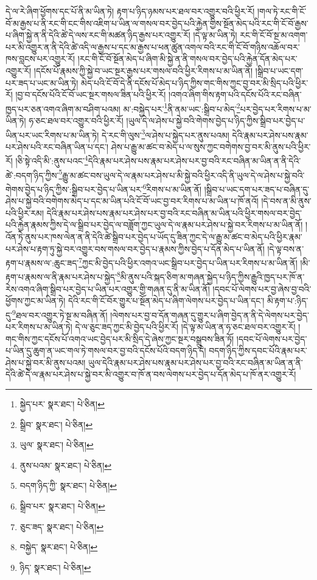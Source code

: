 དེ་ལ་རེ་ཞིག་ཕྱོགས་དང་པོ་ནི་མ་ཡིན་ཏེ། རྟག་པ་ཉིད་ཉམས་པར་ཐལ་བར་འགྱུར་བའི་ཕྱིར་རོ། །གལ་ཏེ་རང་གི་ངོ་བོ་མ་རྒྱས་པ་ནི་རང་གི་ངང་གིས་འཇིག་པ་ཡིན་ལ་གསལ་བར་བྱེད་པའི་རྐྱེན་གྱིས་སྔོན་མེད་པའི་རང་གི་ངོ་བོ་རྒྱས་པ་ཞིག་སྐྱེ་ན་ནི་དེའི་ཚེ་དེ་ལས་རང་གི་མཚན་ཉིད་རྒྱས་པར་འགྱུར་རོ། །དེ་ལྟ་མ་ཡིན་ཏེ། རང་གི་ངོ་བོ་སྔ་མ་འགག་པར་མི་འགྱུར་ན་ནི་དེའི་ཚེ་འདི་ལ་རྒྱས་པ་དང་མ་རྒྱས་པ་ཕན་ཚུན་འགལ་བའི་རང་གི་ངོ་བོ་གཉིས་འཆོལ་བར་ཁས་བླངས་པར་འགྱུར་རོ། །རང་གི་ངོ་བོ་སྔོན་མེད་པ་ཞིག་མི་སྐྱེ་ན་ནི་གསལ་བར་བྱེད་པའི་རྐྱེན་དོན་མེད་པར་འགྱུར་རོ། །དངོས་པོ་རྣམས་ཀྱི་སྐྱེ་བ་ཡང་སྔར་རྒྱས་པར་གསལ་བའི་ཕྱིར་རིགས་པ་མ་ཡིན་ནོ། །སྒྲིབ་པ་ཡང་དག་པར་ཟད་པ་ཡང་མ་ཡིན་ཏེ། མེད་པའི་ངོ་བོ་དེ་ནི་དངོས་པོ་མེད་པ་ཉིད་ཀྱིས་གང་གིས་ཀྱང་བྱ་བར་མི་སྲིད་པའི་ཕྱིར་རོ། །བྱ་བ་དངོས་པོའི་ངོ་བོ་ཡང་སྔར་གསལ་ཟིན་པའི་ཕྱིར་རོ། །འགའ་ཞིག་གིས་རྟག་པའི་དངོས་པོའི་རང་བཞིན་ཁྱད་པར་ཅན་འགའ་ཞིག་མ་བཤིག་པའམ། མ་:བསྐྱེད་པར་\footnote{སྐྱེད་པར་  སྣར་ཐང་།  པེ་ཅིན། }ནི་ནམ་ཡང་:སྒྲིབ་པ་མེད་\footnote{སྒྲིབ་  སྣར་ཐང་།  པེ་ཅིན། }པར་བྱེད་པར་རིགས་པ་མ་ཡིན་ཏེ། ཧ་ཅང་ཐལ་བར་འགྱུར་བའི་ཕྱིར་རོ། །ཡུལ་དེ་ལ་ཤེས་པ་སྐྱེ་བའི་གེགས་བྱེད་པ་ཉིད་ཀྱིས་སྒྲིབ་པར་བྱེད་པ་ཡིན་པར་ཡང་རིགས་པ་མ་ཡིན་ཏེ། དེ་རང་གི་ལུས་\footnote{ཡུལ་  སྣར་ཐང་།  པེ་ཅིན། }ལ་ཤེས་པ་སྐྱེད་པར་ནུས་པའམ། དེའི་རྣམ་པར་ཤེས་པས་རྣམ་པར་ཤེས་པའི་རང་བཞིན་ཡིན་པ་དང་། ཤེས་པ་རྒྱུ་མ་ཚང་བ་མེད་པ་ལ་སུས་ཀྱང་བགེགས་བྱ་བར་མི་ནུས་པའི་ཕྱིར་རོ། །ཅི་སྟེ་འདི་མི་:ནུས་པའང་\footnote{ནུས་པའམ་  སྣར་ཐང་།  པེ་ཅིན། }དེའི་རྣམ་པར་ཤེས་པས་རྣམ་པར་ཤེས་པར་བྱ་བའི་རང་བཞིན་མ་ཡིན་ན་ནི་དེའི་ཚེ་:བདག་ཉིད་ཀྱིས་\footnote{བདག་ཉིད་ཀྱི་  སྣར་ཐང་།  པེ་ཅིན། }རྒྱུ་མ་ཚང་བས་ཡུལ་དེ་ལ་རྣམ་པར་ཤེས་པ་མི་སྐྱེ་བའི་ཕྱིར་འདི་ནི་ཡུལ་དེ་ལ་ཤེས་པ་སྐྱེ་བའི་གེགས་བྱེད་པ་ཉིད་ཀྱིས་:སྒྲིབ་པར་བྱེད་པ་ཡིན་པར་\footnote{སྒྲིབ་པར་  སྣར་ཐང་།  པེ་ཅིན། }རིགས་པ་མ་ཡིན་ནོ། །སྒྲིབ་པ་ཡང་དག་པར་ཟད་པ་བཞིན་དུ་ཤེས་པ་སྐྱེ་བའི་བགེགས་མེད་པ་དང་མ་ཡིན་པའི་ངོ་བོ་ཡང་བྱ་བར་རིགས་པ་མ་ཡིན་པ་ཁོ་ནའོ། །དེ་བས་ན་མི་ནུས་པའི་ཕྱིར་རམ། དེའི་རྣམ་པར་ཤེས་པས་རྣམ་པར་ཤེས་པར་བྱ་བའི་རང་བཞིན་མ་ཡིན་པའི་ཕྱིར་གསལ་བར་བྱེད་པའི་རྐྱེན་རྣམས་ཀྱིས་དེ་ལ་སྒྲིབ་པར་བྱེད་ལ་བཟློག་ཀྱང་ཡུལ་དེ་ལ་རྣམ་པར་ཤེས་པ་སྐྱེ་བར་རིགས་པ་མ་ཡིན་ནོ། །འོན་ཏེ་ནུས་པར་ཁས་ལེན་ན་ནི་དེའི་ཚེ་སྒྲིབ་པར་བྱེད་པ་ཡོད་དུ་ཟིན་ཀྱང་དེ་ལ་རྒྱུ་མ་ཚང་བ་མེད་པའི་ཕྱིར་རྣམ་པར་ཤེས་པ་རྟག་ཏུ་སྐྱེ་བར་འགྱུར་བས་གསལ་བར་བྱེད་པ་རྣམས་ཀྱིས་བྱེད་པ་དོན་མེད་པ་ཡིན་ནོ། །དེ་ལྟ་བས་ན་རྟག་པ་རྣམས་ལ་:ཆུང་ཟད་\footnote{ཅུང་ཟད་  སྣར་ཐང་།  པེ་ཅིན། }ཀྱང་མི་བྱེད་པའི་ཕྱིར་འགའ་ཡང་སྒྲིབ་པར་བྱེད་པ་ཡིན་པར་རིགས་པ་མ་ཡིན་ནོ། །མི་རྟག་པ་རྣམས་ལ་ནི་རྣམ་པར་ཤེས་པ་སྐྱེད་\footnote{བསྐྱེད་  སྣར་ཐང་།  པེ་ཅིན། }མི་ནུས་པའི་སྐད་ཅིག་མ་གཞན་སྐྱེད་པ་ཉིད་ཀྱིས་རྒྱུའི་ཁྱད་པར་ཁོ་ན་རེས་འགའ་ཞིག་སྒྲིབ་པར་བྱེད་པ་ཡིན་པར་འགྱུར་གྱི་གཞན་དུ་ནི་མ་ཡིན་ནོ། །དབང་པོ་ལེགས་པར་བྱ་ཞེས་བྱ་བའི་ཕྱོགས་ཀྱང་མ་ཡིན་ཏེ། དེའི་རང་གི་ངོ་བོར་གྱུར་པ་སྔོན་མེད་པ་ཞིག་ལེགས་པར་བྱེད་པ་ཡིན་དང་། མི་རྟག་པ་:ཉིད་དུ་\footnote{ཉིད་  སྣར་ཐང་།  པེ་ཅིན། }ཐལ་བར་འགྱུར་ཏེ་སྔ་མ་བཞིན་ནོ། །ལེགས་པར་བྱ་བ་དོན་གཞན་དུ་གྱུར་པ་ཞིག་བྱེད་ན་ནི་དེ་ལེགས་པར་བྱེད་པར་རིགས་པ་མ་ཡིན་ཏེ། དེ་ལ་ཅུང་ཟད་ཀྱང་མི་བྱེད་པའི་ཕྱིར་རོ། །དེ་ལྟ་མ་ཡིན་ན་ཧ་ཅང་ཐལ་བར་འགྱུར་རོ། །གང་གིས་ཀྱང་དངོས་པོ་འགའ་ཡང་བྱེད་པར་མི་སྲིད་དེ་ཞེས་ཀྱང་སྔར་བསྒྲུབས་ཟིན་ཏོ། །དབང་པོ་ལེགས་པར་བྱེད་པ་ཡིན་དུ་ཆུག་ན་ཡང་གལ་ཏེ་གསལ་བར་བྱ་བའི་དངོས་པོའི་བདག་ཉིད་དེ། བདག་ཉིད་ཀྱིས་དབང་པོའི་རྣམ་པར་ཤེས་པ་སྐྱེ་བར་མི་ནུས་པའམ། ཡུལ་དེའི་རྣམ་པར་ཤེས་པས་རྣམ་པར་ཤེས་པར་བྱ་བའི་རང་བཞིན་མ་ཡིན་ན་ནི་དེའི་ཚེ་དེ་ལ་རྣམ་པར་ཤེས་པ་སྐྱེ་བར་མི་འགྱུར་བ་ཁོ་ན་བས་ལེགས་པར་བྱེད་པ་དོན་མེད་པ་ཁོ་ནར་འགྱུར་རོ། 